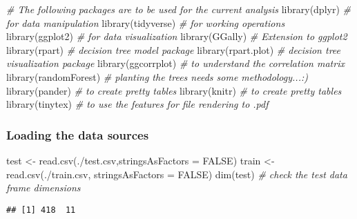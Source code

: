 \documentclass[
]{article}
\newenvironment{Shaded}{\begin{snugshade}}{\end{snugshade}}
\newcommand{\AttributeTok}[1]{\textcolor[rgb]{0.77,0.63,0.00}{#1}}
\newcommand{\CommentTok}[1]{\textcolor[rgb]{0.56,0.35,0.01}{\textit{#1}}}
\newcommand{\ConstantTok}[1]{\textcolor[rgb]{0.00,0.00,0.00}{#1}}
\newcommand{\FunctionTok}[1]{\textcolor[rgb]{0.00,0.00,0.00}{#1}}
\newcommand{\NormalTok}[1]{#1}
\newcommand{\OtherTok}[1]{\textcolor[rgb]{0.56,0.35,0.01}{#1}}
\newcommand{\StringTok}[1]{\textcolor[rgb]{0.31,0.60,0.02}{#1}}
\begin{document}
\begin{Shaded}
\begin{Highlighting}[]
\CommentTok{\# The following packages are to be used for the current analysis}
\FunctionTok{library}\NormalTok{(dplyr)         }\CommentTok{\# for data manipulation}
\FunctionTok{library}\NormalTok{(tidyverse)     }\CommentTok{\# for working operations}
\FunctionTok{library}\NormalTok{(ggplot2)       }\CommentTok{\# for data visualization}
\FunctionTok{library}\NormalTok{(GGally)        }\CommentTok{\# Extension to \textquotesingle{}ggplot2\textquotesingle{}}
\FunctionTok{library}\NormalTok{(rpart)         }\CommentTok{\# decision tree model package}
\FunctionTok{library}\NormalTok{(rpart.plot)    }\CommentTok{\# decision tree visualization package}
\FunctionTok{library}\NormalTok{(ggcorrplot)    }\CommentTok{\# to understand the correlation matrix}
\FunctionTok{library}\NormalTok{(randomForest)  }\CommentTok{\# planting the trees needs some methodology...:)}
\FunctionTok{library}\NormalTok{(pander)        }\CommentTok{\# to create pretty tables}
\FunctionTok{library}\NormalTok{(knitr)         }\CommentTok{\# to create pretty tables}
\FunctionTok{library}\NormalTok{(tinytex)       }\CommentTok{\# to use the features for file rendering to .pdf}
\end{Highlighting}
\end{Shaded}

\hypertarget{loading-the-data-sources}{%
\subsubsection{Loading the data
sources}\label{loading-the-data-sources}}

\begin{Shaded}
\begin{Highlighting}[]
\NormalTok{test }\OtherTok{\textless{}{-}} \FunctionTok{read.csv}\NormalTok{(}\StringTok{\textquotesingle{}./test.csv\textquotesingle{}}\NormalTok{,}\AttributeTok{stringsAsFactors =} \ConstantTok{FALSE}\NormalTok{)}
\NormalTok{train }\OtherTok{\textless{}{-}} \FunctionTok{read.csv}\NormalTok{(}\StringTok{\textquotesingle{}./train.csv\textquotesingle{}}\NormalTok{, }\AttributeTok{stringsAsFactors =} \ConstantTok{FALSE}\NormalTok{)}
\FunctionTok{dim}\NormalTok{(test)   }\CommentTok{\# check the test data frame dimensions}
\end{Highlighting}
\end{Shaded}

\begin{verbatim}
## [1] 418  11
\end{verbatim}
\end{document}
